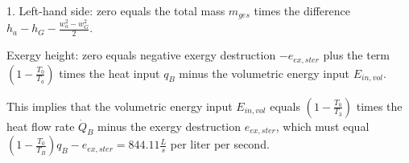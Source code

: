 1. Left-hand side: zero equals the total mass \( m_{ges} \) times the difference \( h_{a} - h_{G} - \frac{w_{a}^{2} - w_{G}^{2}}{2} \).

Exergy height: zero equals negative exergy destruction \( -e_{ex,ster} \) plus the term \( \left(1 - \frac{T_{0}}{T_{a}}\right) \) times the heat input \( q_{B} \) minus the volumetric energy input \( E_{in,vol} \).

This implies that the volumetric energy input \( E_{in,vol} \) equals \( \left(1 - \frac{T_{0}}{T_{3}}\right) \) times the heat flow rate \( \dot{Q}_{B} \) minus the exergy destruction \( e_{ex,ster} \), which must equal \( \left(1 - \frac{T_{0}}{T_{B}}\right) q_{B} - e_{ex,ster} = 844.11 \frac{L}{s} \) per liter per second.